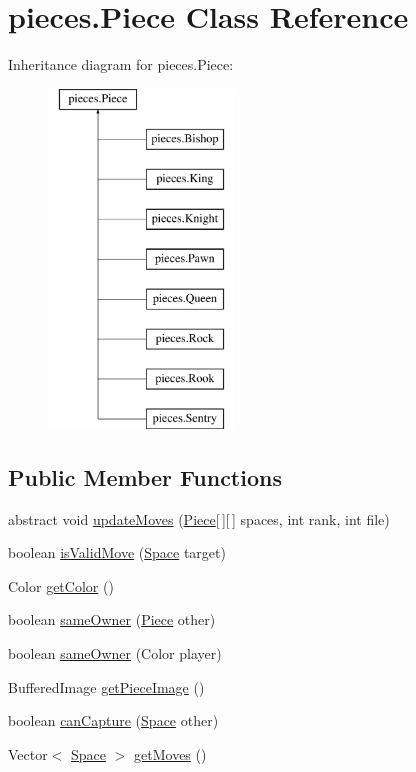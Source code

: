 \hypertarget{classpieces_1_1_piece}{\section{pieces.\-Piece Class Reference}
\label{classpieces_1_1_piece}
}
Inheritance diagram for pieces.\-Piece\-:\begin{figure}[H]
\begin{center}
\leavevmode
\includegraphics[height=9.000000cm]{classpieces_1_1_piece}
\end{center}
\end{figure}
\subsection*{Public Member Functions}
\begin{DoxyCompactItemize}
\item 
abstract void \hyperlink{classpieces_1_1_piece_aa05f11005bbd1b4794ec97cb9911f75a}{update\-Moves} (\hyperlink{classpieces_1_1_piece}{Piece}\mbox{[}$\,$\mbox{]}\mbox{[}$\,$\mbox{]} spaces, int rank, int file)
\item 
boolean \hyperlink{classpieces_1_1_piece_ab940424e2a0c19febbe4bb49e837a401}{is\-Valid\-Move} (\hyperlink{classmodel_1_1_space}{Space} target)
\item 
Color \hyperlink{classpieces_1_1_piece_aee0fc5fa7074b129aaf1f350ac8a7f1b}{get\-Color} ()
\item 
boolean \hyperlink{classpieces_1_1_piece_a4293bd05eab0d665a320f0bee86b498c}{same\-Owner} (\hyperlink{classpieces_1_1_piece}{Piece} other)
\item 
boolean \hyperlink{classpieces_1_1_piece_a8978c74c41b709a09b0219bf73b8a76e}{same\-Owner} (Color player)
\item 
Buffered\-Image \hyperlink{classpieces_1_1_piece_ab4468311fa6d726bcb6306ee9c350c9e}{get\-Piece\-Image} ()
\item 
boolean \hyperlink{classpieces_1_1_piece_a574e624026a0ce3f017374de87fb3ada}{can\-Capture} (\hyperlink{classmodel_1_1_space}{Space} other)
\item 
Vector$<$ \hyperlink{classmodel_1_1_space}{Space} $>$ \hyperlink{classpieces_1_1_piece_a1d7eae0ffb67821c6df54ac6adeaf5de}{get\-Moves} ()
\end{DoxyCompactItemize}
